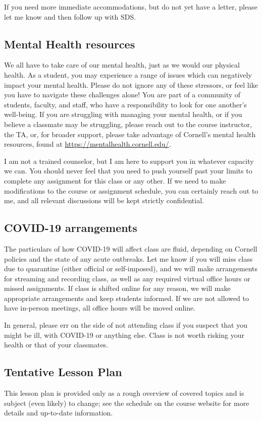 \documentclass[12pt,a4paper]{article}
\begin{document}
If you need more immediate accommodations, but do not yet have a letter, please let me know and then follow up with SDS.

\subsection{Mental Health resources}
We all have to take care of our mental health, just as we would our physical health. As a student, you may experience a range of issues which can negatively impact your mental health. Please do not ignore any of these stressors, or feel like you have to navigate these challenges alone! You are part of a community of students, faculty, and staff, who have a responsibility to look for one another's well-being. If you are struggling with managing your mental health, or if you believe a classmate may be struggling, please reach out to the course instructor, the TA, or, for broader support, please take advantage of Cornell's mental health resources, found at \href{https://mentalhealth.cornell.edu/}{https://mentalhealth.cornell.edu/}.

I am not a trained counselor, but I am here to support you in whatever capacity we can. You should never feel that you need to push yourself past your limits to complete any assignment for this class or any other. If we need to make modifications to the course or assignment schedule, you can certainly reach out to me, and all relevant discussions will be kept strictly confidential.

\subsection{COVID-19 arrangements}
The particulars of how COVID-19 will affect class are fluid, depending on Cornell policies and the state of any acute outbreaks. Let me know if you will miss class due to quarantine (either official or self-imposed), and we will make arrangements for streaming and recording class, as well as any required virtual office hours or missed assignments. If class is shifted online for any reason, we will make appropriate arrangements and keep students informed. If we are not allowed to have in-person meetings, all office hours will be moved online.

In general, please err on the side of not attending class if you suspect that you might be ill, with COVID-19 or anything else. Class is not worth risking your health or that of your classmates.

\subsection{Tentative Lesson Plan}
This lesson plan is provided only as a rough overview of covered topics and is subject (even likely) to change; see the schedule on the course website for more details and up-to-date information.
\end{document}
